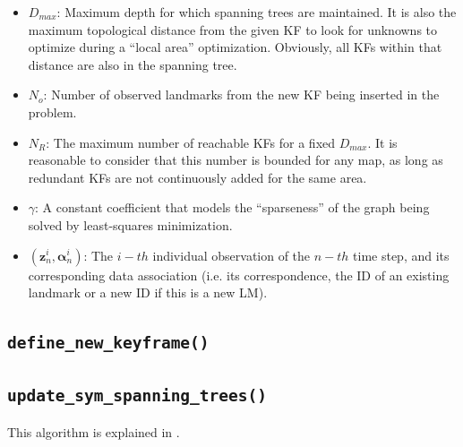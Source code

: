 \documentclass[a4paper,11pt]{article}
\begin{document}
\begin{itemize}
\item{$D_{max}$: Maximum depth for which spanning trees are maintained. It is also the maximum topological distance 
   from the given KF to look for unknowns to optimize during a ``local area'' optimization. Obviously, all KFs within 
   that distance are also in the spanning tree.}
\item{$N_o$: Number of observed landmarks from the new KF being inserted in the problem.}
\item{$N_R$: The maximum number of reachable KFs for a fixed $D_{max}$. It is reasonable to consider that this number 
is bounded for any map, as long as redundant KFs are not continuously added for the same area.}
\item{$\gamma$: A constant coefficient that models the ``sparseness'' of the graph being solved by least-squares minimization.}
\item{$(\mathbf{z}_n^i,\mathbf{\alpha}_n^i)$: The $i-th$ individual observation of the $n-th$ time step, and 
  its corresponding data association (i.e. its correspondence, the ID of an existing landmark or a new ID if this 
  is a new LM).}
\end{itemize}


\newpage
\subsection{\texttt{define\_new\_keyframe()}}
\label{sect:code:define_new_keyframe}




\newpage
\subsection{\texttt{update\_sym\_spanning\_trees()}}

This algorithm is explained in \cite{blanco2013srba}.






\newpage


\end{document}
